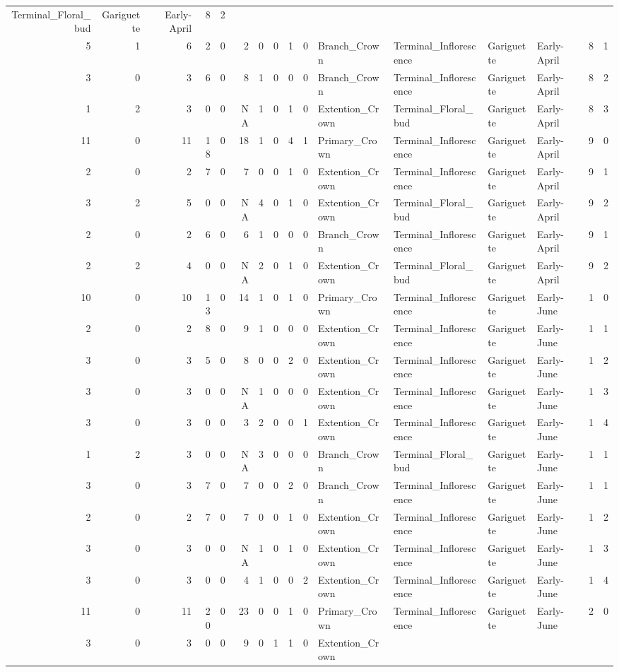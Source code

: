 \documentclass[]{article}
\begin{document}
\begin{longtable}[]{@{}rrrrrrrrrrllllrl@{}}
Terminal\_Floral\_bud & Gariguette & Early-April & 8 & 2\tabularnewline
5 & 1 & 6 & 2 & 0 & 2 & 0 & 0 & 1 & 0 & Branch\_Crown &
Terminal\_Inflorescence & Gariguette & Early-April & 8 &
1\tabularnewline
3 & 0 & 3 & 6 & 0 & 8 & 1 & 0 & 0 & 0 & Branch\_Crown &
Terminal\_Inflorescence & Gariguette & Early-April & 8 &
2\tabularnewline
1 & 2 & 3 & 0 & 0 & NA & 1 & 0 & 1 & 0 & Extention\_Crown &
Terminal\_Floral\_bud & Gariguette & Early-April & 8 & 3\tabularnewline
11 & 0 & 11 & 18 & 0 & 18 & 1 & 0 & 4 & 1 & Primary\_Crown &
Terminal\_Inflorescence & Gariguette & Early-April & 9 &
0\tabularnewline
2 & 0 & 2 & 7 & 0 & 7 & 0 & 0 & 1 & 0 & Extention\_Crown &
Terminal\_Inflorescence & Gariguette & Early-April & 9 &
1\tabularnewline
3 & 2 & 5 & 0 & 0 & NA & 4 & 0 & 1 & 0 & Extention\_Crown &
Terminal\_Floral\_bud & Gariguette & Early-April & 9 & 2\tabularnewline
2 & 0 & 2 & 6 & 0 & 6 & 1 & 0 & 0 & 0 & Branch\_Crown &
Terminal\_Inflorescence & Gariguette & Early-April & 9 &
1\tabularnewline
2 & 2 & 4 & 0 & 0 & NA & 2 & 0 & 1 & 0 & Extention\_Crown &
Terminal\_Floral\_bud & Gariguette & Early-April & 9 & 2\tabularnewline
10 & 0 & 10 & 13 & 0 & 14 & 1 & 0 & 1 & 0 & Primary\_Crown &
Terminal\_Inflorescence & Gariguette & Early-June & 1 & 0\tabularnewline
2 & 0 & 2 & 8 & 0 & 9 & 1 & 0 & 0 & 0 & Extention\_Crown &
Terminal\_Inflorescence & Gariguette & Early-June & 1 & 1\tabularnewline
3 & 0 & 3 & 5 & 0 & 8 & 0 & 0 & 2 & 0 & Extention\_Crown &
Terminal\_Inflorescence & Gariguette & Early-June & 1 & 2\tabularnewline
3 & 0 & 3 & 0 & 0 & NA & 1 & 0 & 0 & 0 & Extention\_Crown &
Terminal\_Inflorescence & Gariguette & Early-June & 1 & 3\tabularnewline
3 & 0 & 3 & 0 & 0 & 3 & 2 & 0 & 0 & 1 & Extention\_Crown &
Terminal\_Inflorescence & Gariguette & Early-June & 1 & 4\tabularnewline
1 & 2 & 3 & 0 & 0 & NA & 3 & 0 & 0 & 0 & Branch\_Crown &
Terminal\_Floral\_bud & Gariguette & Early-June & 1 & 1\tabularnewline
3 & 0 & 3 & 7 & 0 & 7 & 0 & 0 & 2 & 0 & Branch\_Crown &
Terminal\_Inflorescence & Gariguette & Early-June & 1 & 1\tabularnewline
2 & 0 & 2 & 7 & 0 & 7 & 0 & 0 & 1 & 0 & Extention\_Crown &
Terminal\_Inflorescence & Gariguette & Early-June & 1 & 2\tabularnewline
3 & 0 & 3 & 0 & 0 & NA & 1 & 0 & 1 & 0 & Extention\_Crown &
Terminal\_Inflorescence & Gariguette & Early-June & 1 & 3\tabularnewline
3 & 0 & 3 & 0 & 0 & 4 & 1 & 0 & 0 & 2 & Extention\_Crown &
Terminal\_Inflorescence & Gariguette & Early-June & 1 & 4\tabularnewline
11 & 0 & 11 & 20 & 0 & 23 & 0 & 0 & 1 & 0 & Primary\_Crown &
Terminal\_Inflorescence & Gariguette & Early-June & 2 & 0\tabularnewline
3 & 0 & 3 & 0 & 0 & 9 & 0 & 1 & 1 & 0 & Extention\_Crown &

\end{longtable}
\end{document}
